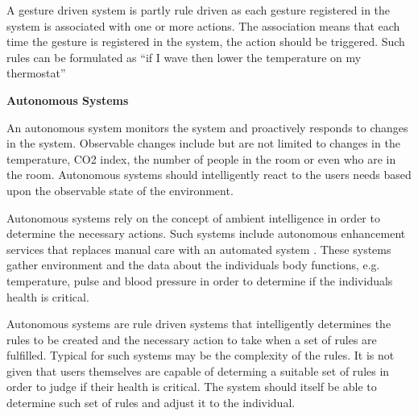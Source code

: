 A gesture driven system is partly rule driven as each gesture registered in the system is associated with one or more actions. The association means that each time the gesture is registered in the system, the action should be triggered. Such rules can be formulated as ``if I wave then lower the temperature on my thermostat''

\textbf{Autonomous Systems}

An autonomous system monitors the system and proactively responds to changes in the system. Observable changes include but are not limited to changes in the temperature, CO2 index, the number of people in the room or even who are in the room.
Autonomous systems should intelligently react to the users needs based upon the observable state of the environment.

Autonomous systems rely on the concept of ambient intelligence in order to determine the necessary actions. Such systems include autonomous enhancement services that replaces manual care with an automated system \cite{nehmer2006living}. These systems gather environment and the data about the individuals body functions, e.g. temperature, pulse and blood pressure in order to determine if the individuals health is critical.

Autonomous systems are rule driven systems that intelligently determines the rules to be created and the necessary action to take when a set of rules are fulfilled. Typical for such systems may be the complexity of the rules. It is not given that users themselves are capable of determing a suitable set of rules in order to judge if their health is critical. The system should itself be able to determine such set of rules and adjust it to the individual.

